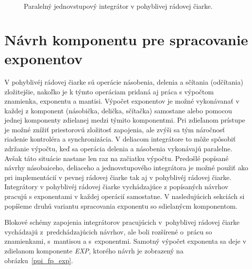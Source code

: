 \bigskip
\begin{figure}[h]
\centering
{}
\caption{Paralelný jednovstupový integrátor v pohyblivej rádovej čiarke.}
\label{ppi_fp}
\end{figure}
\bigskip

\section{Návrh komponentu pre spracovanie exponentov}
V pohyblivéj rádovej čiarke sú operácie násobenia, delenia a sčítania (odčítania) zložitejšie, nakoľko je k týmto operáciam pridaná aj práca s výpočtom znamienka, exponentu a mantisi. Výpočet exponentov je možné vykonávanať v každej z komponent (násobička, delička, sčítačka) samostane alebo pomocou jednej komponenty zdielanej medzi týmito komponentmi. Pri zdieľanom prístupe je možné znížiť priestorovú zložitosť zapojenia, ale zvýši sa tým náročnosť riadenie kontroléra a synchronizácia. V deliacom integrátore to môže spôsobiť zdržanie výpočtu, keď sa operácia delenia a násobenia vykonávajú paralelne. Avšak táto situácie nastane len raz na začiatku výpočtu. Predošlé popísané návrhy násobaiceho, deliaceho a jednovstupového integrátora je možné použiť ako pri implementácií v pevnej rádovej čiarke tak aj v pohyblivéj rádovej čiarke. Integrátory v pohyblivéj rádovej čiarke vychádzajúce z popísaných návrhov pracujú s exponentami v každej operácií samostatne.
V nasledujúcich sekciách si popíšeme druhú variantu spracovania exponentu so sdielanýcm komponentom.

Blokové schémy zapojenia integrátorov pracujúcich v~pohyblivej rádovej čiarke vychádzajú z~predchádzajúcich návrhov, ale boli rozšírené o~prácu so znamienkami, s~mantisou a s~exponentmi. Samotný výpočet exponenta sa deje v zdielanom komponente \textit{EXP}, ktorého návrh je zobrazený na obrázku~\ref{ppi_fp_exp}.

